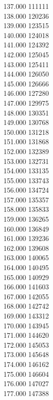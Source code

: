 { 137.000	111111 \\
 138.000	120236 \\
 139.000	123515 \\
 140.000	124018 \\
 141.000	124392 \\
 142.000	125045 \\
 143.000	125411 \\
 144.000	126050 \\
 145.000	126666 \\
 146.000	127280 \\
 147.000	129975 \\
 148.000	130351 \\
 149.000	130768 \\
 150.000	131218 \\
 151.000	131868 \\
 152.000	132389 \\
 153.000	132731 \\
 154.000	133135 \\
 155.000	133743 \\
 156.000	134724 \\
 157.000	135357 \\
 158.000	135833 \\
 159.000	136265 \\
 160.000	136849 \\
 161.000	139236 \\
 162.000	139608 \\
 163.000	140065 \\
 164.000	140495 \\
 165.000	140929 \\
 166.000	141603 \\
 167.000	142055 \\
 168.000	142742 \\
 169.000	143312 \\
 170.000	143945 \\
 171.000	144620 \\
 172.000	145053 \\
 173.000	145648 \\
 174.000	146162 \\
 175.000	146604 \\
 176.000	147027 \\
 177.000	147388 \\
}
